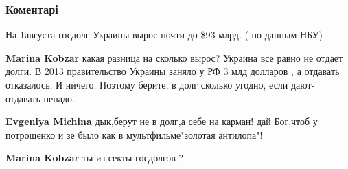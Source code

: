  
 
 
 
 
\subsubsection{Коментарі}

\begin{itemize}
 
На 1августа госдолг Украины вырос почти до \$93 млрд. ( по данным НБУ)

\begin{itemize}
 
\textbf{Marina Kobzar} какая разница на сколько вырос? Украина все равно не отдает долги. В 2013 правительство Украины заняло у РФ 3 млд долларов , а отдавать отказалось. И ничего.
Поэтому берите, в долг сколько угодно, если дают- отдавать ненадо.

 
\textbf{Evgeniya Michina} дык,берут не в долг,а себе на карман! дай Бог,чтоб у потрошенко и зе было как в мультфильме"золотая антилопа"!

 
\textbf{Marina Kobzar} ты из секты госдолгов ?
\end{itemize}


\end{itemize}
